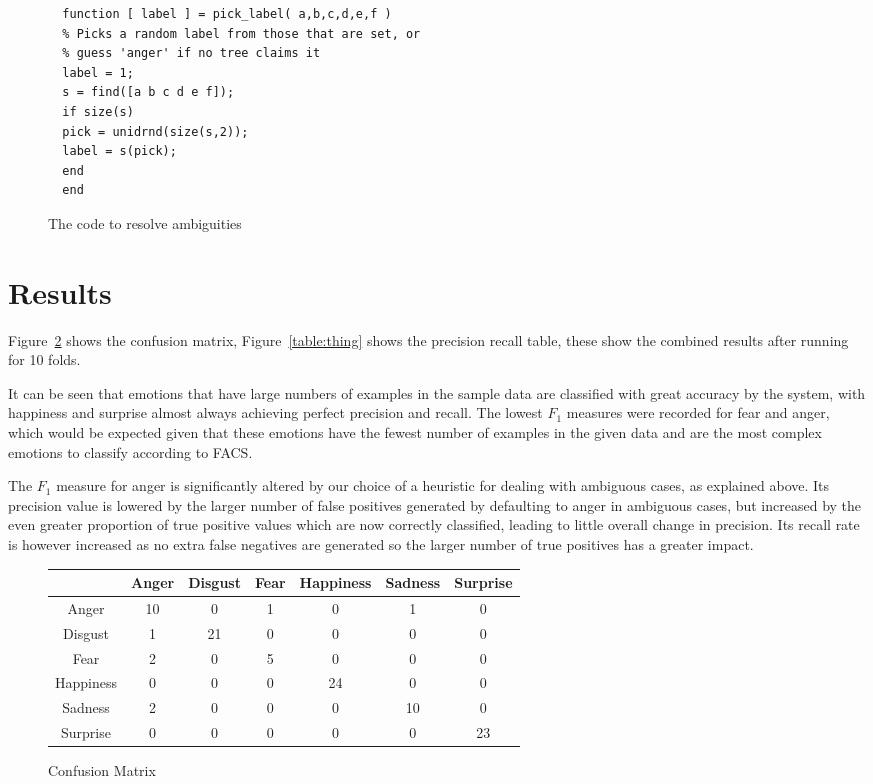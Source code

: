 \documentclass[a4paper]{article}
\begin{document}
\begin{figure}[h]
  \lstset{language=Matlab}
  \centering
  \begin{lstlisting}
  function [ label ] = pick_label( a,b,c,d,e,f )
  % Picks a random label from those that are set, or
  % guess 'anger' if no tree claims it
  label = 1;
  s = find([a b c d e f]);
  if size(s)
  pick = unidrnd(size(s,2));
  label = s(pick);
  end
  end
  \end{lstlisting}
  \caption{The code to resolve ambiguities}
  \label{code:pick_label}
\end{figure}

\section{Results}
Figure~\ref{table:confusion} shows the confusion matrix,
Figure~\ref{table:thing} shows the precision recall table, these show the
combined results after running for 10 folds.

It can be seen that emotions that have large numbers of examples in the sample
data are classified with great accuracy by the system, with happiness and
surprise almost always achieving perfect precision and recall. The lowest $F_1$
measures were recorded for fear and anger, which would be expected given that
these emotions have the fewest number of examples in the given data and are the
most complex emotions to classify according to FACS.

The $F_1$ measure for anger is significantly altered by our choice of a
heuristic for dealing with ambiguous cases, as explained above. Its precision
value is lowered by the larger number of false positives generated by
defaulting to anger in ambiguous cases, but increased by the even greater
proportion of true positive values which are now correctly classified, leading
to little overall change in precision. Its recall rate is however increased as
no extra false negatives are generated so the larger number of true positives
has a greater impact.

\begin{figure}
  \centering
  \begin{tabular}{c|cccccc}
    & Anger & Disgust & Fear & Happiness & Sadness & Surprise \\
    \hline
    Anger & 10 & 0 & 1 & 0 & 1 & 0 \\
  Disgust & 1 & 21 & 0 & 0 & 0 & 0 \\
     Fear & 2 & 0 & 5 & 0 & 0 & 0 \\
Happiness & 0 & 0 & 0 & 24 & 0 & 0 \\
  Sadness & 2 & 0 & 0 & 0 & 10 & 0 \\
 Surprise & 0 & 0 & 0 & 0 & 0 & 23 \\
  \end{tabular}
  \caption{Confusion Matrix}
  \label{table:confusion}
\end{figure}
\end{document}
